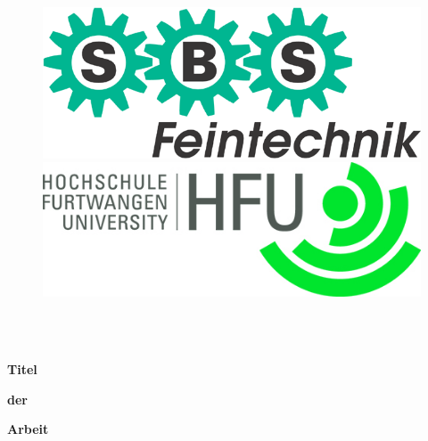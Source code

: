 \begin{titlepage}

  \begin{figure}
      \centering
      \begin{minipage}{.5\textwidth}
        \centering
        \includegraphics[width=.8\linewidth]{files/SBS-FCOL.png}
      \end{minipage}%
      \begin{minipage}{.5\textwidth}
        \centering
        \includegraphics[width=.8\linewidth]{files/Logo_HFU_42x15mm.jpg}
      \end{minipage}
  \end{figure}

  \begin{center}



      \vspace*{1cm}

      {\Large \selectfont {Wissenschaftliche Arbeit}} \\
      {\normalsize \selectfont {in}} \\
      {\Large \selectfont {Studiengang XXXXXXXXXX}}

      {\small \selectfont {Fakultät XXXXXXXXXX}}

      \vspace*{1cm}

      {\huge \selectfont \bfseries {Titel}}

      {\huge \selectfont \bfseries {der}}

      {\huge \selectfont \bfseries {Arbeit}}

      {\Large \selectfont {Untertitel der Arbeit}}


\end{center}
\end{titlepage}
